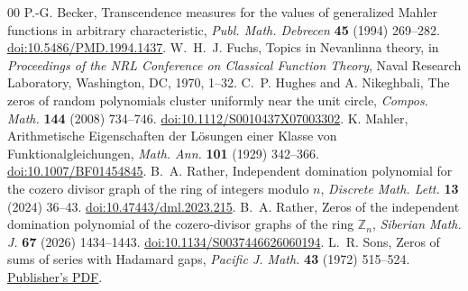 \documentclass[11pt]{article}
\newcommand{\Z}{\mathbb Z}
\begin{document}
\small
\begin{thebibliography}{00}
P.-G. Becker, Transcendence measures for the values of generalized
Mahler functions in arbitrary characteristic,
\emph{Publ. Math. Debrecen} \textbf{45} (1994) 269--282.
\href{https://doi.org/10.5486/PMD.1994.1437}{doi:10.5486/PMD.1994.1437}.
W.~H.~J. Fuchs, Topics in Nevanlinna theory, in \emph{Proceedings of
the NRL Conference on Classical Function Theory}, Naval Research
Laboratory, Washington, DC, 1970, 1--32.
C.~P. Hughes and A. Nikeghbali, The zeros of random polynomials cluster
uniformly near the unit circle, \emph{Compos. Math.} \textbf{144}
(2008) 734--746. \href{https://doi.org/10.1112/S0010437X07003302}{doi:10.1112/S0010437X07003302}.
K. Mahler, Arithmetische Eigenschaften der L\"osungen einer Klasse
von Funktionalgleichungen, \emph{Math. Ann.} \textbf{101} (1929)
342--366. \href{https://doi.org/10.1007/BF01454845}{doi:10.1007/BF01454845}.
B.~A. Rather, Independent domination polynomial for the cozero divisor
graph of the ring of integers modulo \(n\), \emph{Discrete Math. Lett.}
\textbf{13} (2024) 36--43.
\href{https://www.dmlett.com/archive/v13/DML24_v13_pp36-43.pdf}{doi:10.47443/dml.2023.215}.
B.~A. Rather, Zeros of the independent domination polynomial of the
cozero-divisor graphs of the ring \(\Z_n\), \emph{Siberian Math. J.}
\textbf{67} (2026) 1434--1443.
\href{https://doi.org/10.1134/S0037446626060194}{doi:10.1134/S0037446626060194}.
L.~R. Sons, Zeros of sums of series with Hadamard gaps,
\emph{Pacific J. Math.} \textbf{43} (1972) 515--524.
\href{https://msp.org/pjm/1972/43-2/pjm-v43-n2-p24-p.pdf}{Publisher's PDF}.
\end{thebibliography}
\end{document}
